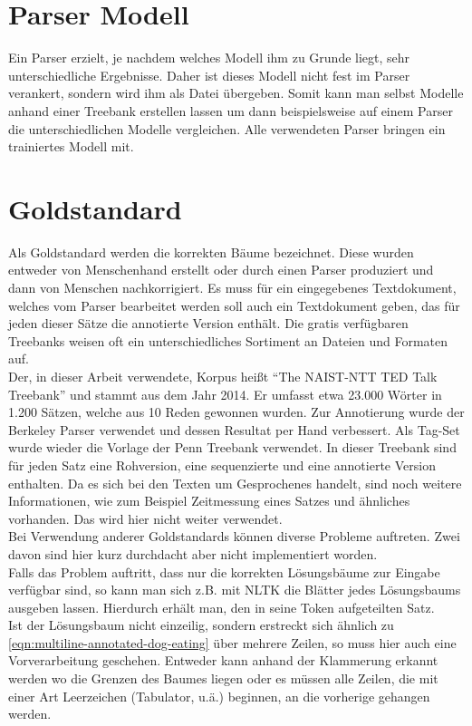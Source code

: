 \section{Parser Modell}
Ein Parser erzielt, je nachdem welches Modell ihm zu Grunde liegt, sehr unterschiedliche Ergebnisse. Daher ist dieses Modell nicht fest im Parser verankert, sondern wird ihm als Datei übergeben. Somit kann man selbst Modelle anhand einer Treebank erstellen lassen um dann beispielsweise auf einem Parser die unterschiedlichen Modelle vergleichen. Alle verwendeten Parser bringen ein trainiertes Modell mit.  %

\section{Goldstandard}
Als Goldstandard werden die korrekten Bäume bezeichnet. Diese wurden entweder von Menschenhand erstellt oder durch einen Parser produziert und dann von Menschen nachkorrigiert. Es muss für ein eingegebenes Textdokument, welches vom Parser bearbeitet werden soll auch ein Textdokument geben, das für jeden dieser Sätze die annotierte Version enthält. Die gratis verfügbaren Treebanks weisen oft ein unterschiedliches Sortiment an Dateien und Formaten auf.\\
Der, in dieser Arbeit verwendete, Korpus heißt ``The NAIST-NTT TED Talk Treebank'' und stammt aus dem Jahr 2014. Er umfasst etwa 23.000 Wörter in 1.200 Sätzen, welche aus 10 Reden gewonnen wurden. Zur Annotierung wurde der Berkeley Parser verwendet und dessen Resultat per Hand verbessert. Als Tag-Set wurde wieder die Vorlage der Penn Treebank verwendet. 
In dieser Treebank sind für jeden Satz eine Rohversion, eine sequenzierte und eine annotierte Version enthalten. Da es sich bei den Texten um Gesprochenes handelt, sind noch weitere Informationen, wie zum Beispiel Zeitmessung eines Satzes und ähnliches vorhanden. Das wird hier nicht weiter verwendet.\\
Bei Verwendung anderer Goldstandards können diverse Probleme auftreten. Zwei davon sind hier kurz durchdacht aber nicht implementiert worden.\\
Falls das Problem auftritt, dass nur die korrekten Lösungsbäume zur Eingabe verfügbar sind, so kann man sich z.B. mit NLTK %
die Blätter jedes Lösungsbaums ausgeben lassen. Hierdurch erhält man, den in seine Token aufgeteilten Satz.\\
Ist der Lösungsbaum nicht einzeilig, sondern erstreckt sich ähnlich zu \ref{eqn:multiline-annotated-dog-eating}  über mehrere Zeilen, so muss hier auch eine Vorverarbeitung geschehen. Entweder kann anhand der Klammerung erkannt werden wo die Grenzen des Baumes liegen oder es müssen alle Zeilen, die mit einer Art Leerzeichen (Tabulator, u.ä.) beginnen, an die vorherige gehangen werden.

